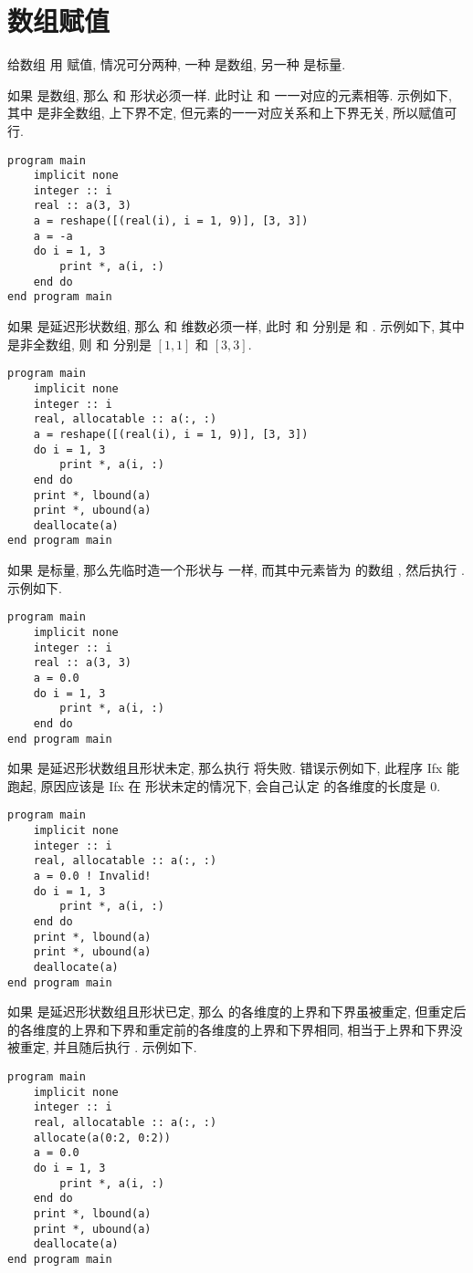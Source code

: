 \section{数组赋值}\label{fortran_array_assignment}

给数组  用  赋值, 情况可分两种, 一种  是数组, 另一种  是标量.

如果  是数组, 那么  和  形状必须一样. 此时让  和  一一对应的元素相等. 示例如下, 其中  是非全数组, 上下界不定, 但元素的一一对应关系和上下界无关, 所以赋值可行.
\begin{lstlisting}
program main
    implicit none
    integer :: i
    real :: a(3, 3)
    a = reshape([(real(i), i = 1, 9)], [3, 3])
    a = -a
    do i = 1, 3
        print *, a(i, :)
    end do
end program main
\end{lstlisting}

如果  是延迟形状数组, 那么  和  维数必须一样, 此时  和  分别是  和 . 示例如下, 其中  是非全数组, 则  和  分别是 $[1,1]$ 和 $[3,3]$.
\begin{lstlisting}
program main
    implicit none
    integer :: i
    real, allocatable :: a(:, :)
    a = reshape([(real(i), i = 1, 9)], [3, 3])
    do i = 1, 3
        print *, a(i, :)
    end do
    print *, lbound(a)
    print *, ubound(a)
    deallocate(a)
end program main
\end{lstlisting}

如果  是标量, 那么先临时造一个形状与  一样, 而其中元素皆为  的数组 , 然后执行 . 示例如下.
\begin{lstlisting}
program main
    implicit none
    integer :: i
    real :: a(3, 3)
    a = 0.0
    do i = 1, 3
        print *, a(i, :)
    end do
end program main
\end{lstlisting}
如果  是延迟形状数组且形状未定, 那么执行  将失败. 错误示例如下, 此程序 Ifx 能跑起, 原因应该是 Ifx 在  形状未定的情况下, 会自己认定  的各维度的长度是 $0$.
\begin{lstlisting}
program main
    implicit none
    integer :: i
    real, allocatable :: a(:, :)
    a = 0.0 ! Invalid!
    do i = 1, 3
        print *, a(i, :)
    end do
    print *, lbound(a)
    print *, ubound(a)
    deallocate(a)
end program main
\end{lstlisting}
如果  是延迟形状数组且形状已定, 那么  的各维度的上界和下界虽被重定, 但重定后的各维度的上界和下界和重定前的各维度的上界和下界相同, 相当于上界和下界没被重定, 并且随后执行 . 示例如下.
\begin{lstlisting}
program main
    implicit none
    integer :: i
    real, allocatable :: a(:, :)
    allocate(a(0:2, 0:2))
    a = 0.0
    do i = 1, 3
        print *, a(i, :)
    end do
    print *, lbound(a)
    print *, ubound(a)
    deallocate(a)
end program main
\end{lstlisting}

